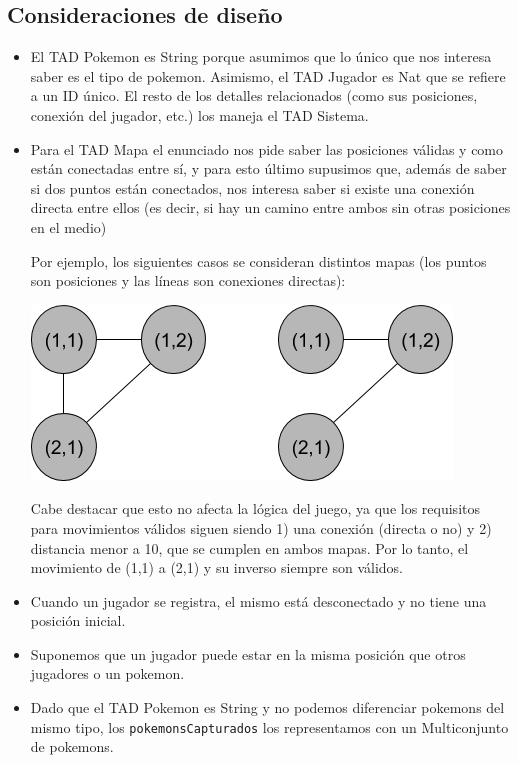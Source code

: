 \renewcommand{\labelitemi}{\textbullet}

\subsection{Consideraciones de diseño}
\begin{itemize}

	\item El TAD Pokemon es String porque asumimos que lo único que nos interesa saber es el tipo de pokemon. Asimismo, el TAD Jugador es Nat que se refiere a un ID único. El resto de los detalles relacionados (como sus posiciones, conexión del jugador, etc.) los maneja el TAD Sistema.

	\item Para el TAD Mapa el enunciado nos pide saber las posiciones válidas y como están conectadas entre sí, y para esto último supusimos que, además de saber si dos puntos están conectados, nos interesa saber si existe una conexión directa entre ellos (es decir, si hay un camino entre ambos sin otras posiciones en el medio)

	Por ejemplo, los siguientes casos se consideran distintos mapas (los puntos son posiciones y las líneas son conexiones directas):

	\bigskip
	\centerline{\includegraphics[scale=0.5]{nodos-mapa.png}}

	Cabe destacar que esto no afecta la lógica del juego, ya que los requisitos para movimientos válidos siguen siendo 1) una conexión (directa o no) y 2) distancia menor a 10, que se cumplen en ambos mapas. Por lo tanto, el movimiento de (1,1) a (2,1) y su inverso siempre son válidos.

	\item Cuando un jugador se registra, el mismo está desconectado y no tiene una posición inicial.

	\item Suponemos que un jugador puede estar en la misma posición que otros jugadores o un pokemon.

	\item Dado que el TAD Pokemon es String y no podemos diferenciar pokemons del mismo tipo, los \texttt{pokemonsCapturados} los representamos con un Multiconjunto de pokemons.


\end{itemize}
